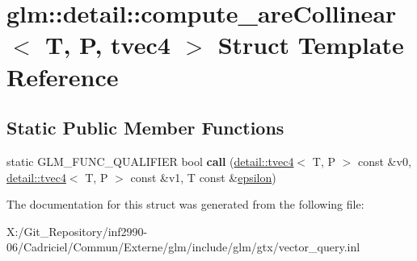 \hypertarget{structglm_1_1detail_1_1compute__are_collinear_3_01_t_00_01_p_00_01tvec4_01_4}{\section{glm\-:\-:detail\-:\-:compute\-\_\-are\-Collinear$<$ T, P, tvec4 $>$ Struct Template Reference}
\label{structglm_1_1detail_1_1compute__are_collinear_3_01_t_00_01_p_00_01tvec4_01_4}
}
\subsection*{Static Public Member Functions}
\begin{DoxyCompactItemize}
\item 
\hypertarget{structglm_1_1detail_1_1compute__are_collinear_3_01_t_00_01_p_00_01tvec4_01_4_a4a7e3fba780b73ef237fbf76dc6ead91}{static G\-L\-M\-\_\-\-F\-U\-N\-C\-\_\-\-Q\-U\-A\-L\-I\-F\-I\-E\-R bool {\bfseries call} (\hyperlink{structglm_1_1detail_1_1tvec4}{detail\-::tvec4}$<$ T, P $>$ const \&v0, \hyperlink{structglm_1_1detail_1_1tvec4}{detail\-::tvec4}$<$ T, P $>$ const \&v1, T const \&\hyperlink{group__gtc__constants_gacb41049b8d22c8aa90e362b96c524feb}{epsilon})}\label{structglm_1_1detail_1_1compute__are_collinear_3_01_t_00_01_p_00_01tvec4_01_4_a4a7e3fba780b73ef237fbf76dc6ead91}

\end{DoxyCompactItemize}


The documentation for this struct was generated from the following file\-:\begin{DoxyCompactItemize}
\item 
X\-:/\-Git\-\_\-\-Repository/inf2990-\/06/\-Cadriciel/\-Commun/\-Externe/glm/include/glm/gtx/vector\-\_\-query.\-inl\end{DoxyCompactItemize}
